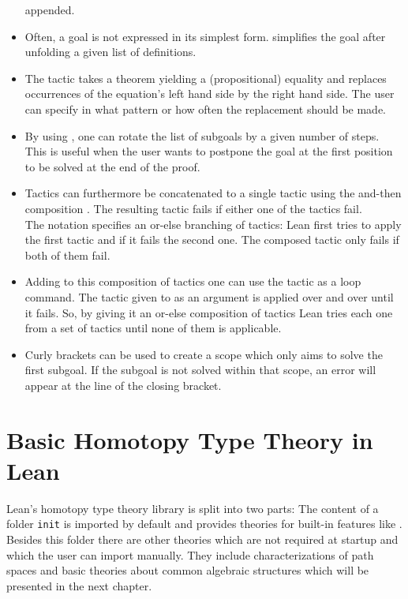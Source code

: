 \begin{itemize}
appended.
\item Often, a goal is not expressed in its simplest form.
 simplifies the goal after unfolding a given list of definitions.
\item The  tactic takes a theorem yielding a (propositional)
equality and replaces occurrences of the equation's left hand side by the 
right hand side.
The user can specify in what pattern or how often the replacement should be made.
\item By using , one can rotate the list of subgoals by a given
number of steps.
This is useful when the user wants to postpone the goal at the first position
to be solved at the end of the proof.
\item Tactics can furthermore be concatenated to a single tactic using the and-then
composition .
The resulting tactic fails if either one of the tactics fail. \\
The notation  specifies an or-else branching of tactics:
Lean first tries to apply the first tactic and if it fails the second one.
The composed tactic only fails if both of them fail.
\item Adding to this composition of tactics one can use the 
tactic as a loop command.
The tactic given to  as an argument is applied over and over until
it fails.
So, by giving it an or-else composition of tactics Lean tries each one from a set
of tactics until none of them is applicable.
\item Curly brackets can be used to create a scope which only aims to solve the
first subgoal.
If the subgoal is not solved within that scope, an error will appear at the line
of the closing bracket. %
\end{itemize} %

\section{Basic Homotopy Type Theory in Lean}

Lean's homotopy type theory library is split into two parts:
The content of a folder \texttt{init} is imported by default and provides
theories for built-in features like .
Besides this folder there are other theories which are not required at startup
and which the user can import manually.
They include characterizations of path spaces and basic theories about common
algebraic structures which will be presented in the next chapter.

